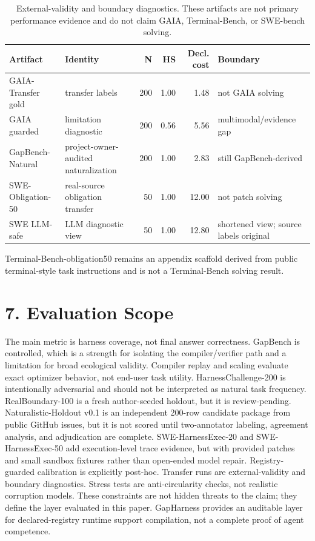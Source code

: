 \documentclass[
  10pt,
]{article}
\begin{document}
\begin{table}[H]
\centering
\scriptsize
\caption{External-validity and boundary diagnostics. These artifacts are not primary performance evidence and do not claim GAIA, Terminal-Bench, or SWE-bench solving.}
\label{tab:boundary}
\begin{tabular}{llrrrl}
\toprule
Artifact & Identity & N & HS & Decl. cost & Boundary\\
\midrule
GAIA-Transfer gold & transfer labels & 200 & 1.00 & 1.48 & not GAIA solving\\
GAIA guarded & limitation diagnostic & 200 & 0.56 & 5.56 & multimodal/evidence gap\\
GapBench-Natural & project-owner-audited naturalization & 200 & 1.00 & 2.83 & still GapBench-derived\\
SWE-Obligation-50 & real-source obligation transfer & 50 & 1.00 & 12.00 & not patch solving\\
SWE LLM-safe & LLM diagnostic view & 50 & 1.00 & 12.80 & shortened view; source labels original\\
\bottomrule
\end{tabular}
\end{table}

Terminal-Bench-obligation50 remains an appendix scaffold derived from
public terminal-style task instructions and is not a Terminal-Bench
solving result.

\section{7. Evaluation Scope}\label{evaluation-scope}

The main metric is harness coverage, not final answer correctness.
GapBench is controlled, which is a strength for isolating the
compiler/verifier path and a limitation for broad ecological validity.
Compiler replay and scaling evaluate exact optimizer behavior, not
end-user task utility. HarnessChallenge-200 is intentionally adversarial
and should not be interpreted as natural task frequency.
RealBoundary-100 is a fresh author-seeded holdout, but it is
review-pending. Naturalistic-Holdout v0.1 is an independent 200-row
candidate package from public GitHub issues, but it is not scored until
two-annotator labeling, agreement analysis, and adjudication are
complete. SWE-HarnessExec-20 and SWE-HarnessExec-50 add execution-level
trace evidence, but with provided patches and small sandbox fixtures
rather than open-ended model repair. Registry-guarded calibration is
explicitly post-hoc. Transfer runs are external-validity and boundary
diagnostics. Stress tests are anti-circularity checks, not realistic
corruption models. These constraints are not hidden threats to the
claim; they define the layer evaluated in this paper. GapHarness
provides an auditable layer for declared-registry runtime support
compilation, not a complete proof of agent competence.
\end{document}
